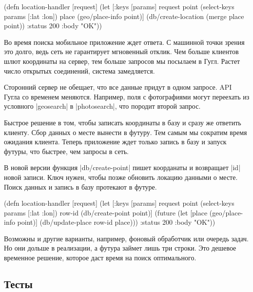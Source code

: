 \begin{english}
  \begin{clojure}
(defn location-handler [request]
  (let [{:keys [params]} request
        point (select-keys params [:lat :lon])
        place (geo/place-info point)]
    (db/create-location (merge place point))
    {:status 200 :body "OK"}))
  \end{clojure}
\end{english}

Во время поиска мобильное приложение ждет ответа. С машинной точки зрения это
долго, ведь сеть не гарантирует мгновенный отклик. Чем больше клиентов шлют
координаты на сервер, тем больше запросов мы посылаем в Гугл. Растет число
открытых соединений, система замедляется.

Сторонний сервер не обещает, что все данные придут в одном запросе. API Гугла со
временем меняются. Например, поля с фотографиями могут переехать из условного
\spverb|geosearch| в \spverb|photosearch|, что породит второй запрос.

Быстрое решение в том, чтобы записать координаты в базу и сразу же ответить
клиенту. Сбор данных о месте вынести в футуру. Тем самым мы сократим время
ожидания клиента. Теперь приложение ждет только запись в базу и запуск футуры,
что быстрее, чем запросы в сеть.

В новой версии функция \spverb|db/create-point| пишет коорданаты и возвращает
\spverb|id| новой записи. Ключ нужен, чтобы позже обновить локацию данными о
месте. Поиск данных и запись в базу протекают в футуре.

\begin{english}
  \begin{clojure}
(defn location-handler
  [request]
  (let [{:keys [params]} request
        point (select-keys params [:lat :lon])
        row-id (db/create-point point)]
    (future
      (let [place (geo/place-info point)]
        (db/update-place row-id place)))
    {:status 200 :body "OK"}))
  \end{clojure}
\end{english}

Возможны и другие варианты, например, фоновый обработчик или очередь задач. Но
они дольше в реализации, а футура займет лишь три строки. Это дешевое временное
решение, которое даст время на поиск оптимального.

\subsection{Тесты}

